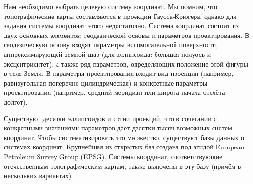 \documentclass[
  12pt,
]{book}
\begin{document}
Нам необходимо выбрать целевую систему координат. Мы помним, что топографические карты составляются в проекции Гаусса-Крюгера, однако для задания системы координат этого недостаточно. Система координат состоит из двух основных элементов: геодезической основы и параметров проектирования. В геодезическую основу входят параметры вспомогательной поверхности, аппроксимирующей земной шар (для эллипсоида: большая полуось и эксцентриситет), а также ряд параметров, определяющих положение этой фигуры в теле Земли. В параметры проектирования входит вид проекции (например, равноугольная поперечно-цилиндрическая) и конкретные параметры проектирования (например, средний меридиан или широта начала отсчёта долгот).

Существуют десятки эллипсоидов и сотни проекций, что в сочетании с конкретными значениями параметров даёт десятки тысяч возможных систем координат. Чтобы систематизировать это множество, существуют базы данных о системах координат. Крупнейшая из открытых баз создана под эгидой European Petroleum Survey Group (EPSG). Системы координат, соответствующие отечественным топографическим картам, также включены в эту базу (причём в нескольких вариантах)
\end{document}
